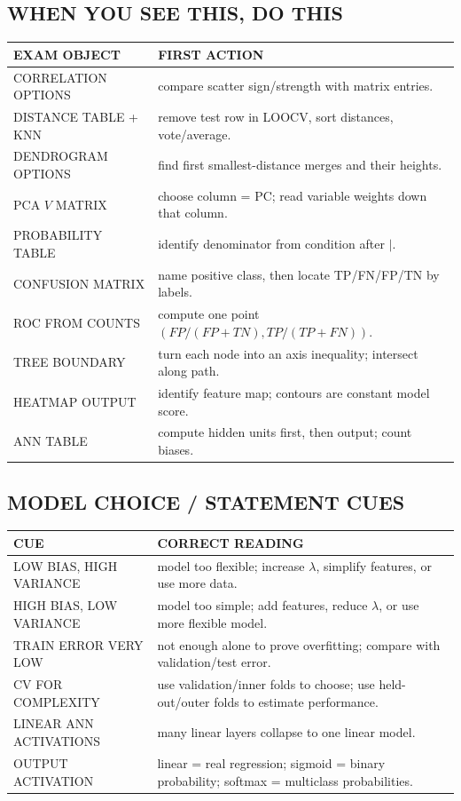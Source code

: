 \subsection*{WHEN YOU SEE THIS, DO THIS}
\begin{tabularx}{\linewidth}{@{}lX@{}}
\toprule
EXAM OBJECT & FIRST ACTION\\ \midrule
CORRELATION OPTIONS & compare scatter sign/strength with matrix entries.\\
DISTANCE TABLE + KNN & remove test row in LOOCV, sort distances, vote/average.\\
DENDROGRAM OPTIONS & find first smallest-distance merges and their heights.\\
PCA $V$ MATRIX & choose column = PC; read variable weights down that column.\\
PROBABILITY TABLE & identify denominator from condition after $|$.\\
CONFUSION MATRIX & name positive class, then locate TP/FN/FP/TN by labels.\\
ROC FROM COUNTS & compute one point $(FP/(FP+TN),TP/(TP+FN))$.\\
TREE BOUNDARY & turn each node into an axis inequality; intersect along path.\\
HEATMAP OUTPUT & identify feature map; contours are constant model score.\\
ANN TABLE & compute hidden units first, then output; count biases.\\
\bottomrule
\end{tabularx}

\subsection*{MODEL CHOICE / STATEMENT CUES}
\begin{tabularx}{\linewidth}{@{}lX@{}}
\toprule
CUE & CORRECT READING\\ \midrule
LOW BIAS, HIGH VARIANCE & model too flexible; increase $\lambda$, simplify features, or use more data.\\
HIGH BIAS, LOW VARIANCE & model too simple; add features, reduce $\lambda$, or use more flexible model.\\
TRAIN ERROR VERY LOW & not enough alone to prove overfitting; compare with validation/test error.\\
CV FOR COMPLEXITY & use validation/inner folds to choose; use held-out/outer folds to estimate performance.\\
LINEAR ANN ACTIVATIONS & many linear layers collapse to one linear model.\\
OUTPUT ACTIVATION & linear = real regression; sigmoid = binary probability; softmax = multiclass probabilities.\\
\bottomrule
\end{tabularx}

